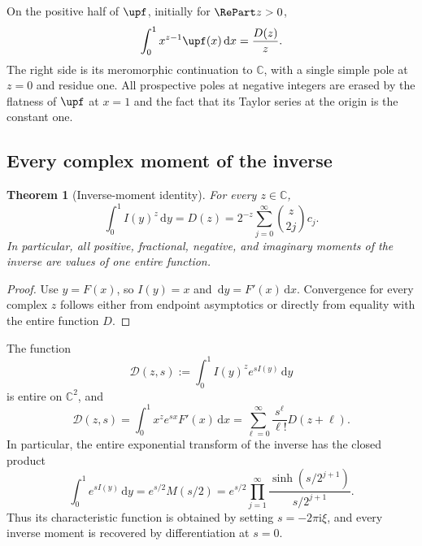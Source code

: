 \documentclass[11pt,oneside]{article}
\newtheorem{theorem}{Theorem}[section]
\theoremstyle{definition}
\theoremstyle{remark}
\newcommand{\C}{\mathbb C}
\newcommand{\dd}{\,\mathrm d}
\newcommand{\ii}{\mathrm i}
\newcommand{\1}{\mathbf 1}
\begin{document}
On the positive half of \(\upf\), initially for \(\RePart z>0\),
\begin{equation}
 \int_0^1x^{z-1}\upf(x)\dd x=\frac{D(z)}{z}.             \label{p6:eq:up-mellin}
\end{equation}
The right side is its meromorphic continuation to \(\C\), with a single simple pole at
\(z=0\) and residue one.  All prospective poles at negative integers are erased by the
flatness of \(\upf\) at \(x=1\) and the fact that its Taylor series at the origin is the
constant one.

\subsection{Every complex moment of the inverse}

\begin{theorem}[Inverse-moment identity]
\label{p6:thm:inverse-mellin}
For every \(z\in\C\),
\begin{equation}
 \boxed{
 \int_0^1I(y)^z\dd y=D(z)
 =2^{-z}\sum_{j=0}^{\infty}\binom z{2j}c_j.
 }                                                        \label{p6:eq:inverse-mellin}
\end{equation}
In particular, all positive, fractional, negative, and imaginary moments of the inverse
are values of one entire function.
\end{theorem}

\begin{proof}
Use \(y=F(x)\), so \(I(y)=x\) and \(\dd y=F'(x)\dd x\).  Convergence for every
complex \(z\) follows either from endpoint asymptotics or directly from equality with the
entire function \(D\).
\end{proof}

\begin{corollary}
\label{p6:cor:inverse-two-variable-transform}
The function
\begin{equation}
 \mathcal D(z,s):=\int_0^1 I(y)^z e^{sI(y)}\dd y             \label{p6:eq:D-two-variable-def}
\end{equation}
is entire on \(\C^2\), and
\begin{equation}
 \boxed{
 \mathcal D(z,s)=\int_0^1x^ze^{sx}F'(x)\dd x
 =\sum_{\ell=0}^{\infty}\frac{s^\ell}{\ell!}D(z+\ell).
 }                                                          \label{p6:eq:D-two-variable-series}
\end{equation}
In particular, the entire exponential transform of the inverse has the closed product
\begin{equation}
 \boxed{
 \int_0^1e^{sI(y)}\dd y=e^{s/2}M(s/2)
 =e^{s/2}\prod_{j=1}^{\infty}
   \frac{\sinh(s/2^{j+1})}{s/2^{j+1}}.
 }                                                          \label{p6:eq:inverse-exponential-transform}
\end{equation}
Thus its characteristic function is obtained by setting \(s=-2\pi\ii\xi\), and every
inverse moment is recovered by differentiation at \(s=0\).
\end{corollary}
\end{document}
